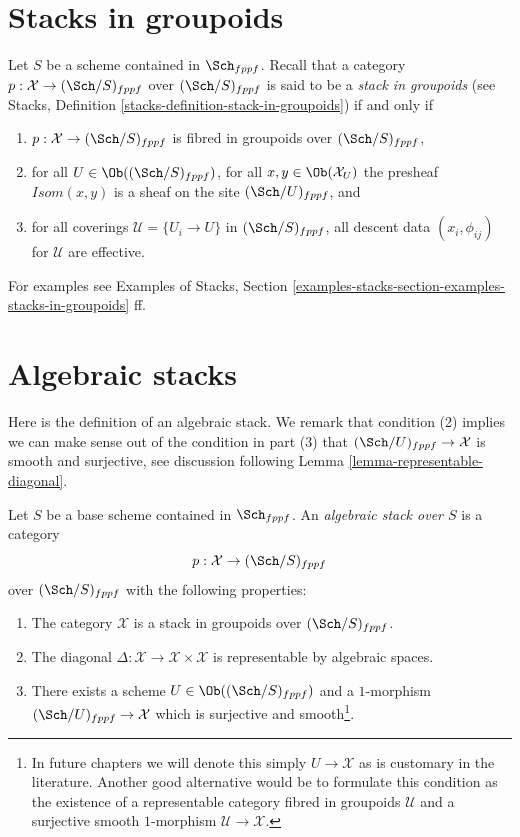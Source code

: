 \section{Stacks in groupoids}
\label{section-stacks}

\noindent
Let $S$ be a scheme contained in $\Sch_{fppf}$.
Recall that a category $p : \mathcal{X} \to (\Sch/S)_{fppf}$
over $(\Sch/S)_{fppf}$ is said to be a
{\it stack in groupoids} (see
Stacks, Definition \ref{stacks-definition-stack-in-groupoids})
if and only if
\begin{enumerate}
\item $p : \mathcal{X} \to (\Sch/S)_{fppf}$ is fibred
in groupoids over $(\Sch/S)_{fppf}$,
\item for all $U \in \Ob((\Sch/S)_{fppf})$,
for all $x, y\in \Ob(\mathcal{X}_U)$ the presheaf
$\mathit{Isom}(x, y)$ is a sheaf on the site $(\Sch/U)_{fppf}$, and
\item for all coverings $\mathcal{U} = \{U_i \to U\}$ in
$(\Sch/S)_{fppf}$, all descent data $(x_i, \phi_{ij})$
for $\mathcal{U}$ are effective.
\end{enumerate}
For examples see
Examples of Stacks,
Section \ref{examples-stacks-section-examples-stacks-in-groupoids}
ff.










\section{Algebraic stacks}
\label{section-algebraic-stacks}

\noindent
Here is the definition of an algebraic stack. We remark that condition
(2) implies we can make sense out of the condition in part (3) that
$(\Sch/U)_{fppf} \to \mathcal{X}$
is smooth and surjective, see discussion following
Lemma \ref{lemma-representable-diagonal}.

\begin{definition}
\label{definition-algebraic-stack}
Let $S$ be a base scheme contained in $\Sch_{fppf}$.
An {\it algebraic stack over $S$} is a category
$$
p : \mathcal{X} \to (\Sch/S)_{fppf}
$$
over $(\Sch/S)_{fppf}$ with the following properties:
\begin{enumerate}
\item The category $\mathcal{X}$ is a stack in groupoids over
$(\Sch/S)_{fppf}$.
\item The diagonal
$\Delta : \mathcal{X} \to \mathcal{X} \times \mathcal{X}$
is representable by algebraic spaces.
\item There exists a scheme $U \in \Ob((\Sch/S)_{fppf})$
and a $1$-morphism $(\Sch/U)_{fppf} \to \mathcal{X}$
which is surjective and smooth\footnote{In future chapters we will denote
this simply $U \to \mathcal{X}$ as is customary in the literature. Another
good alternative would be to formulate this condition as the existence of a
representable category fibred in groupoids $\mathcal{U}$ and a surjective
smooth $1$-morphism $\mathcal{U} \to \mathcal{X}$.}.
\end{enumerate}
\end{definition}

